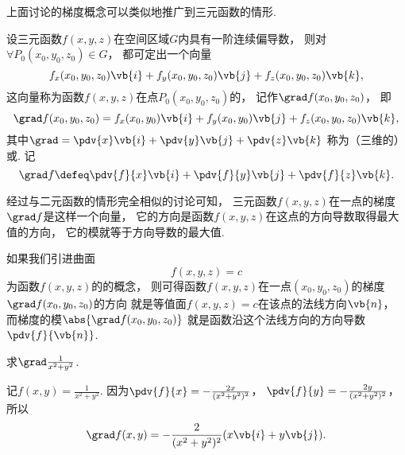 上面讨论的梯度概念可以类似地推广到三元函数的情形.
\begin{definition}
设三元函数\(f(x,y,z)\)在空间区域\(G\)内具有一阶连续偏导数，
则对\(\forall P_0(x_0,y_0,z_0) \in G\)，
都可定出一个向量\begin{equation*}
f_x(x_0,y_0,z_0) \vb{i} + f_y(x_0,y_0,z_0) \vb{j} + f_z(x_0,y_0,z_0) \vb{k},
\end{equation*}
这向量称为函数\(f(x,y,z)\)在点\(P_0(x_0,y_0,z_0)\)的，
记作\(\grad f(x_0,y_0,z_0)\)，
即\begin{equation*}
	\grad f(x_0,y_0,z_0)
	= f_x(x_0,y_0) \vb{i} + f_y(x_0,y_0) \vb{j} + f_z(x_0,y_0,z_0) \vb{k},
\end{equation*}
其中\(\grad = \pdv{x} \vb{i} + \pdv{y} \vb{j} + \pdv{z} \vb{k}\)
称为（三维的）或.
记\begin{equation*}
	\grad f
	\defeq
	\pdv{f}{x} \vb{i} + \pdv{f}{y} \vb{j} + \pdv{f}{z} \vb{k}.
\end{equation*}
\end{definition}

经过与二元函数的情形完全相似的讨论可知，
三元函数\(f(x,y,z)\)在一点的梯度\(\grad f\)是这样一个向量，
它的方向是函数\(f(x,y,z)\)在这点的方向导数取得最大值的方向，
它的模就等于方向导数的最大值.

如果我们引进曲面\begin{equation*}
f(x,y,z) = c
\end{equation*}为函数\(f(x,y,z)\)的的概念，
则可得函数\(f(x,y,z)\)在一点\((x_0,y_0,z_0)\)的梯度\(\grad f(x_0,y_0,z_0)\)的方向
就是等值面\(f(x,y,z) = c\)在该点的法线方向\(\vb{n}\)，
而梯度的模\(\abs{\grad f(x_0,y_0,z_0)}\)
就是函数沿这个法线方向的方向导数\(\pdv{f}{\vb{n}}\).

\begin{example}
求\(\grad \frac{1}{x^2+y^2}\).
\begin{solution}
记\(f(x,y) = \frac{1}{x^2+y^2}\).
因为\(\pdv{f}{x} = -\frac{2x}{(x^2+y^2)^2}\)，
\(\pdv{f}{y} = -\frac{2y}{(x^2+y^2)^2}\)，
所以\begin{equation*}
	\grad f(x,y) = -\frac{2}{(x^2+y^2)^2} (x \vb{i} + y \vb{j}).
\end{equation*}
\end{solution}
\end{example}

